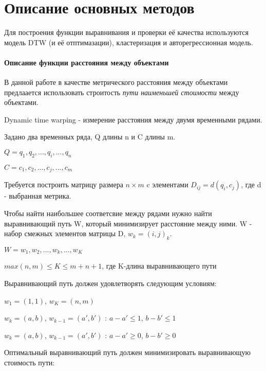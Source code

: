 \documentclass[12pt,twoside]{article}
\begin{document}
    \section{Описание основных методов}
            
            Для построения функции выравнивания и проверки её качества используются модель DTW (и её отптимазации), кластеризация и авторегрессионная модель.
            
            \paragraph{Описание функции расстояния между объектами}
            
            В данной работе в качестве метрического расстояния между объектами предлаается использовать строитость \textit{пути наименьшей стоимости} между объектами.
            
            Dynamic time warping - измерение расстояния между двумя временными рядами.
            
            Задано два временных ряда, Q длины n и C длины m.
            
            $Q=q_1,q_2, ..., q_i, ..., q_n $
            
            $C=c_1,c_2, ..., c_j, ..., c_m $
            
            Требуется построить матрицу размера $n\times m$ c элементами $D_{ij}=d(q_i, c_j)$, где d - выбранная метрика.
            
            Чтобы найти наибольшее соответсвие между рядами нужно найти выравнивающий путь W, который минимизирует расстояние между ними. W - набор смежных элементов матрицы D, $w_k = (i, j)_k$.
            
            $W = w_1,w_2, ..., w_k, ..., w_K $

            $max(n, m)\leq K \leq m+n+1$, где K-длина выравнивающего пути
            
            Выравнивающий путь должен удовлетворять следующим условиям:
            
            $w_1=(1,1)$, $w_K=(n, m)$
            
            $w_k = (a, b)$, $w_{k-1}=(a', b')$ : $a-a' \leq 1$, $b-b' \leq 1$ 
            
            $w_k = (a, b)$, $w_{k-1}=(a', b')$ : $a-a' \geq 0$, $b-b'\geq 0$
            
            Оптимальный выравнивающий путь должен минимизировать выравнивающую стоимость пути:
            
\end{document}

